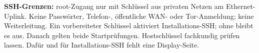 \textbf{SSH-Grenzen:} root-Zugang nur mit Schlüssel aus privaten Netzen am Ethernet-Uplink. Keine Passwörter, Telefon-, öffentliche WAN- oder Tor-Anmeldung; keine Weiterleitung. Ein vorbereiteter Schlüssel aktiviert Installations-SSH; ohne bleibt es aus. Danach gelten beide Startprüfungen. Hostschlüssel fachkundig prüfen lassen. Dafür und für Installations-SSH fehlt eine Display-Seite.

